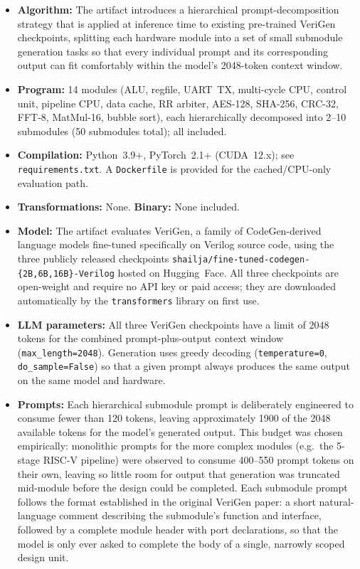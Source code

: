 \documentclass[sigplan,10pt,twocolumn]{acmart}
\begin{document}
\begin{itemize}
  \item \textbf{Algorithm:} The artifact introduces a hierarchical prompt-decomposition
        strategy that is applied at inference time to existing pre-trained
        VeriGen checkpoints, splitting each hardware module into a set of
        small submodule generation tasks so that every individual prompt
        and its corresponding output can fit comfortably within the
        model's 2048-token context window.
  \item \textbf{Program:} 14 modules (ALU, regfile, UART~TX, multi-cycle CPU,
        control unit, pipeline CPU, data cache, RR arbiter, AES-128, SHA-256,
        CRC-32, FFT-8, MatMul-16, bubble sort), each hierarchically
        decomposed into 2--10 submodules (50 submodules total); all
        included.
  \item \textbf{Compilation:} Python~3.9+, PyTorch~2.1+ (CUDA~12.x); see
        \texttt{requirements.txt}. A \texttt{Dockerfile} is provided for the
        cached/CPU-only evaluation path.
  \item \textbf{Transformations:} None. \quad \textbf{Binary:} None included.
  \item \textbf{Model:} The artifact evaluates VeriGen, a family of
        CodeGen-derived language models fine-tuned specifically on Verilog
        source code, using the three publicly released checkpoints
        \texttt{shailja/fine-tuned-\allowbreak codegen-\{2B,6B,16B\}-Verilog}
        hosted on Hugging~Face. All three checkpoints are open-weight and
        require no API key or paid access; they are downloaded
        automatically by the \texttt{transformers} library on first use.
  \item \textbf{LLM parameters:} All three VeriGen checkpoints have a limit of 2048 tokens for the combined prompt-plus-output context window (\texttt{max\_length=2048}). Generation uses greedy decoding (\texttt{temperature=0}, \texttt{do\_sample=False}) so that a given prompt always produces the same output on the same model and hardware.

  \item \textbf{Prompts:} Each hierarchical submodule prompt
  is deliberately engineered to consume fewer than 120 tokens, leaving approximately  1900 of the 2048 available tokens for the model's generated output. This budget was chosen empirically: monolithic prompts for the more complex modules (e.g.\ the 5-stage RISC-V pipeline) were observed to consume 400--550 prompt tokens on their own, leaving so little room for output that generation was
truncated mid-module before the design could be completed. Each submodule prompt follows the format established in the original VeriGen paper: a short natural-language comment describing the submodule's function and interface, followed by a complete module header with port declarations, so that the model is only ever asked to complete the body of a single, narrowly scoped design unit.


\end{itemize}
\end{document}
